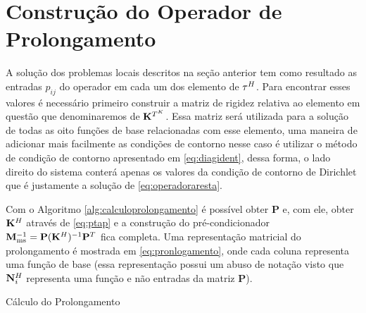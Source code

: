 \section{Construção do Operador de Prolongamento}

A solução dos problemas locais descritos na seção anterior tem como resultado as entradas $p_{ij}$ do operador em cada um dos elemento de $\tau^H$. Para encontrar esses valores é necessário primeiro construir a matriz de rigidez relativa ao elemento em questão que denominaremos de $\mathbf{K}^{T^K}$. Essa matriz será utilizada para a solução de todas as oito funções de base relacionadas com esse elemento, uma maneira de adicionar mais facilmente as condições de contorno nesse caso é utilizar o método de condição de contorno apresentado em \eqref{eq:diagident}, dessa forma, o lado direito do sistema conterá apenas os valores da condição de contorno de Dirichlet que é justamente a solução de \eqref{eq:operadoraresta}.


Com o Algoritmo \ref{alg:calculoprolongamento} é possível obter $\mathbf{P}$ e, com ele, obter $\mathbf{K}^H$ através de \eqref{eq:ptap} e a construção do pré-condicionador $\mathbf{M}^{-1}_{\text{ms}} = \mathbf{P} (\mathbf{K}^H)^{-1} \mathbf{P}^{T}$ fica completa. Uma representação matricial do prolongamento é mostrada em \eqref{eq:pronlogamento}, onde cada coluna representa uma função de base (essa representação possui um abuso de notação visto que $\mathbf{N}_{i}^H$ representa uma função e não entradas da matriz $\mathbf{P}$).



\vspace{1cm}
\begin{algorithm}[H]
\caption{Cálculo do Prolongamento}\label{alg:calculoprolongamento}
\end{algorithm}
\vspace{1cm}






